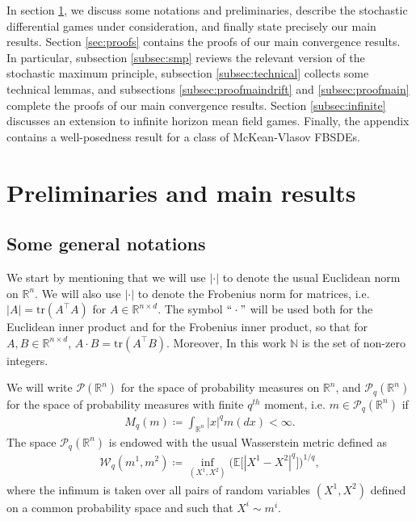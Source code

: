 \documentclass[11pt,reqno]{amsart}
\numberwithin{equation}{section}
\theoremstyle{definition}
\def\E{{\mathbb E}}
\def\R{{\mathbb R}}
\def\N{{\mathbb N}}
\def\tr{{\mathrm{tr}}}
\newcommand{\sP}{\mathcal{P}}
\newcommand\cW{\mathcal W}
\def \E{\mathbb{E}}
\def \N{\mathbb{N}}
\def \R{\mathbb{R}}
\begin{document}
In section \ref{sec:results}, we discuss some notations and preliminaries, describe the stochastic differential games under consideration, and finally state precisely our main results. Section \ref{sec:proofs} contains the proofs of our main convergence results. In particular, subsection \ref{subsec:smp} reviews the relevant version of the stochastic maximum principle, subsection \ref{subsec:technical} collects some technical lemmas, and subsections \ref{subsec:proofmaindrift} and \ref{subsec:proofmain} complete the proofs of our main convergence results. Section \ref{subsec:infinite} discusses an extension to infinite horizon mean field games. Finally, the appendix contains a well-posedness result for a class of McKean-Vlasov FBSDEs.

\section{Preliminaries and main results} \label{sec:results}

\subsection{Some general notations}
We start by mentioning that we will use $|\cdot|$ to denote the usual Euclidean norm on $\R^n$. We will also use $|\cdot|$ to denote the Frobenius norm for matrices, i.e. $|A| = \tr(A^{\top} A)$ for $A \in \R^{n \times d}$. The symbol $``\cdot"$ will be used both for the Euclidean inner product and for the Frobenius inner product, so that for $A, B \in \R^{n \times d}$, $A \cdot B = \tr(A^{\top} B)$.
Moreover, {In this work $\N$ is the set of non-zero integers.}

We will write $\sP(\R^n)$ for the space of probability measures on $\R^n$, and $\sP_q(\R^n)$ for the space of probability measures with finite $q^{th}$ moment, i.e. $m \in \sP_q(\R^n)$ if 
\begin{align*}
M_q(m) \coloneqq \int_{\R^n} |x|^q m(dx) < \infty. 
\end{align*}
The space $\sP_q(\R^n)$ is endowed with the usual Wasserstein metric defined as
\begin{align}
\label{eq:def.Wasserstein}
  \cW_q(m^1,m^2) \coloneqq \inf_{(X^1,X^2)} \Big(\E\big[|X^1-X^2|^q \big] \Big)^{1/q}, 
\end{align}
where the infimum is taken over all pairs of random variables $(X^1,X^2)$ defined on a common probability space and such that $X^i \sim  m^i$. 
\end{document}
